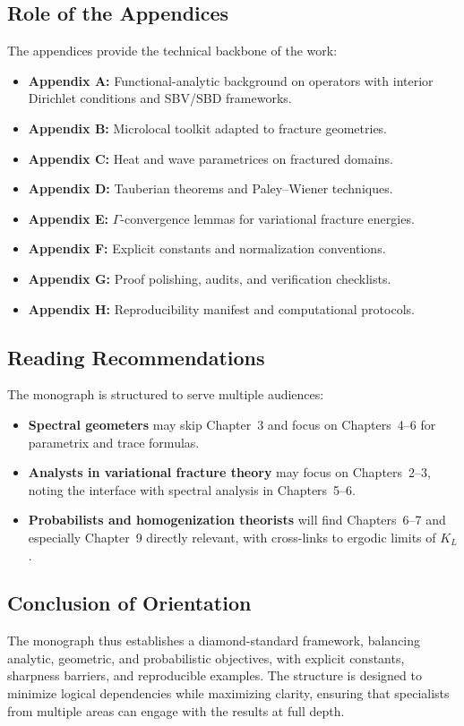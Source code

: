 \subsection*{Role of the Appendices}
The appendices provide the technical backbone of the work:
\begin{itemize}
  \item \textbf{Appendix A:} Functional-analytic background on operators with interior
  Dirichlet conditions and SBV/SBD frameworks.
  \item \textbf{Appendix B:} Microlocal toolkit adapted to fracture geometries.
  \item \textbf{Appendix C:} Heat and wave parametrices on fractured domains.
  \item \textbf{Appendix D:} Tauberian theorems and Paley–Wiener techniques.
  \item \textbf{Appendix E:} $\Gamma$-convergence lemmas for variational fracture
  energies.
  \item \textbf{Appendix F:} Explicit constants and normalization conventions.
  \item \textbf{Appendix G:} Proof polishing, audits, and verification checklists.
  \item \textbf{Appendix H:} Reproducibility manifest and computational protocols.
\end{itemize}

\subsection*{Reading Recommendations}
The monograph is structured to serve multiple audiences:
\begin{itemize}
  \item \textbf{Spectral geometers} may skip Chapter~3 and focus on Chapters~4–6 for
  parametrix and trace formulas.
  \item \textbf{Analysts in variational fracture theory} may focus on Chapters~2–3,
  noting the interface with spectral analysis in Chapters~5–6.
  \item \textbf{Probabilists and homogenization theorists} will find Chapters~6–7 and
  especially Chapter~9 directly relevant, with cross-links to ergodic limits of $K_L$.
\end{itemize}

\subsection*{Conclusion of Orientation}
The monograph thus establishes a diamond-standard framework, balancing analytic,
geometric, and probabilistic objectives, with explicit constants, sharpness barriers,
and reproducible examples. The structure is designed to minimize logical dependencies
while maximizing clarity, ensuring that specialists from multiple areas can engage
with the results at full depth.

